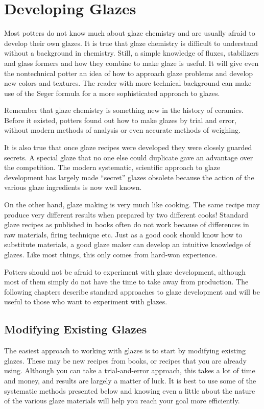 \chapter{Developing Glazes}
Most potters do not know much about glaze chemistry and are usually afraid to 
develop their own glazes. It is true that glaze chemistry is difficult to 
understand without a background in chemistry. Still, a simple knowledge of 
fluxes, stabilizers and glass formers and how they combine to make glaze is 
useful. It will give even the nontechnical potter an idea of how to approach 
glaze problems and develop new colors and textures. The reader with more 
technical background can make use of the Seger formula for a more sophisticated 
approach to glazes.

Remember that glaze chemistry is something new in the history of ceramics. 
Before it existed, potters found out how to make glazes by trial and error, 
without modern methods of analysis or even accurate methods of weighing.

It is also true that once glaze recipes were developed they were closely 
guarded secrets. A special glaze that no one else could duplicate gave an 
advantage over the competition. The modern systematic, scientific approach to 
glaze development has largely made ``secret'' glazes obsolete because the 
action of the various glaze ingredients is now well known.

On the other hand, glaze making is very much like cooking. The same recipe may 
produce very different results when prepared by two different cooks! Standard 
glaze recipes as published in books often do not work because of differences in 
raw materials, firing technique etc. Just as a good cook should know how to 
substitute materials, a good glaze maker can develop an intuitive knowledge of 
glazes. Like most things, this only comes from hard-won experience.

Potters should not be afraid to experiment with glaze development, although 
most of them simply do not have the time to take away from production. The 
following chapters describe standard approaches to glaze development and will 
be useful to those who want to experiment with glazes.
\section{Modifying Existing Glazes}
The easiest approach to working with glazes is to start by modifying existing 
glazes. These may be new recipes from books, or recipes that you are already 
using. Although you can take a trial-and-error approach, this takes a lot of 
time and money, and results are largely a matter of luck. It is best to use 
some of the systematic methods presented below and knowing even a little about 
the nature of the various glaze materials will help you reach your goal more 
efficiently.

